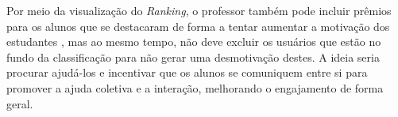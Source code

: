 Por meio da visualização do \textit{Ranking}, o professor também pode incluir prêmios para os alunos que se destacaram de forma a tentar aumentar a motivação dos estudantes \cite{ranking_motivation}, mas ao mesmo tempo, não deve excluir os usuários que estão no fundo da classificação para não gerar uma desmotivação destes. A ideia seria procurar ajudá-los e incentivar que os alunos se comuniquem entre si para promover a ajuda coletiva e a interação, melhorando o engajamento de forma geral.
